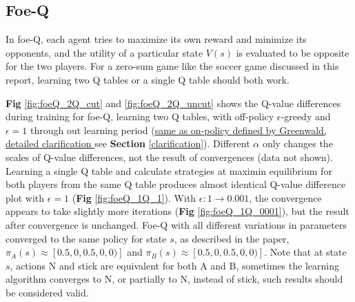 \documentclass[10pt]{article}
\begin{document}

\subsection{Foe-Q} \label{foeQ}
In foe-Q, each agent tries to maximize its own reward and minimize its opponents, and the utility of a particular state $V(s)$ is evaluated to be opposite for the two players. For a zero-sum game like the soccer game discussed in this report, learning two Q tables or a single Q table should both work.\par 
\textbf{Fig} \ref{fig:foeQ_2Q_cut} and \ref{fig:foeQ_2Q_uncut} shows the Q-value differences during training for foe-Q, learning two Q tables, with off-policy $\epsilon$-greedy and $\epsilon=1$ through out learning period (\ul{same as on-policy defined by Greenwald, detailed clarification }see \textbf{Section} \ref{clarification})\cite{GreenwaldCorrelatedQLearning2005}. Different $\alpha$ only changes the scales of Q-value differences, not the result of convergences (data not shown). Learning a single Q table and calculate strategies at maximin equilibrium for both players from the same Q table produces almost identical Q-value difference plot with $\epsilon=1$ (\textbf{Fig} \ref{fig:foeQ_1Q_1}). With $\epsilon:1\rightarrow0.001$, the convergence appears to take slightly more iterations (\textbf{Fig} \ref{fig:foeQ_1Q_0001}), but the result after convergence is unchanged. Foe-Q with all different variations in parameters converged to the same policy for state $s$, as described in the paper\cite{GreenwaldCorrelatedQLearning2003}, $\pi_A(s)\approx[0.5,0,0.5,0,0)]$ and $\pi_B(s)\approx[0.5,0,0.5,0,0)]$. Note that at state $s$, actions N and stick are equivalent for both A and B, sometimes the learning algorithm converges to N, or partially to N, instead of stick, such results should be considered valid.
\end{document}
